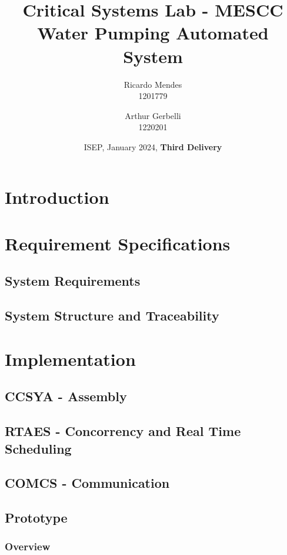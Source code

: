 \documentclass[11pt]{article}
\title{\textbf{Critical Systems Lab - MESCC\\ Water Pumping Automated System}}
\date{ISEP, January 2024, \textbf{Third Delivery}}
\author{Ricardo Mendes\\ 1201779
\and Arthur Gerbelli\\ 1220201}
\begin{document}
\maketitle              
\newpage
\tableofcontents
\newpage

%
\section{Introduction}


\section{Requirement Specifications}

\subsection{System Requirements}

\subsection{System Structure and Traceability}


\newpage
\section{Implementation}

\subsection{CCSYA - Assembly}

\subsection{RTAES - Concorrency and Real Time Scheduling}

\subsection{COMCS - Communication}

\subsection{Prototype}

\subsubsection{Overview}
\end{document}
